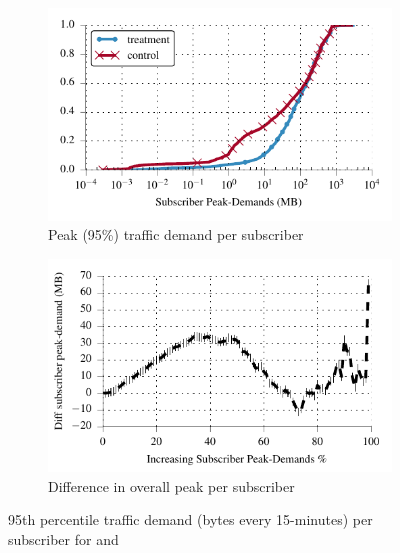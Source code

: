 \begin{figure}[t]
\begin{minipage}{1\linewidth}
\centering
%
%
\begin{subfigure}[b]{1\linewidth}
\includegraphics[width=\linewidth]{figures/cdf_peak_demand-overall.pdf}
               \caption{Peak (95\%) traffic demand per subscriber\label{fig:CDF-data-rate-perc95}}
\end{subfigure}

\begin{subfigure}[b]{1\linewidth}
\includegraphics[width=\linewidth]{figures/diff_perc95_bytes_subsc-overall_01.pdf}		%
               \caption{Difference in overall peak per subscriber\label{fig:diff-peak-overall}}
\end{subfigure}
%
\end{minipage}
\caption{95th percentile traffic demand (bytes every 15-minutes) per subscriber for \control{} and \treatment{}\label{fig:traffic-demand-overall}}
\end{figure}

